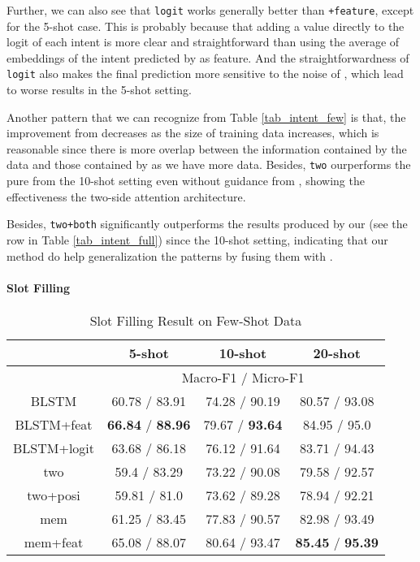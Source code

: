 Further, we can also see that \texttt{logit} works generally better than \texttt{+feature}, except for the 5-shot case. This is probably because that adding a value directly to the logit of each intent is more clear and straightforward than using the average of embeddings of the intent predicted by \RE as feature. And the straightforwardness of \texttt{logit} also makes the final prediction more sensitive to the noise of \RE, which lead to worse results in the 5-shot setting.

Another pattern that we can recognize from Table \ref{tab_intent_few} is that, the improvement from \RE decreases as the size of training data increases, which is reasonable since there is more overlap between the information contained by the data and those contained by \RE as we have more data. Besides, \texttt{two} ourperforms the pure \BLSTM from the 10-shot setting even without guidance from \RE, showing the effectiveness the two-side attention architecture.

Besides, \texttt{two+both} significantly outperforms the results produced by our \RE (see the \RE row in Table \ref{tab_intent_full}) since the 10-shot setting, indicating that our method do help generalization the \RE patterns by fusing them with \NN. 


\paragraph{Slot Filling}

\begin{table}
\setlength{\tabcolsep}{0.23em}
\centering
\small{
\begin{tabular}{|c|c|c|c|}

\hline
  & \multicolumn{1}{|c|}{5-shot} & \multicolumn{1}{|c|}{10-shot} & \multicolumn{1}{|c|}{20-shot}  \\
 \hline
  &  \multicolumn{3}{|c|}{Macro-F1 / Micro-F1}   \\
\hline
BLSTM & 60.78 / 83.91 & 74.28  / 90.19 & 80.57 / 93.08 \\
\hline
BLSTM+feat & \textbf{66.84} / \textbf{88.96} & 79.67 / \textbf{93.64} & 84.95 / 95.0 \\
\hline
BLSTM+logit & 63.68 / 86.18 & 76.12 / 91.64  & 83.71 / 94.43 \\
\hline
two & 59.4 / 83.29 & 73.22 / 90.08 & 79.58 / 92.57 \\
\hline
two+posi & 59.81 / 81.0 & 73.62 / 89.28 & 78.94 / 92.21 \\
\hline
mem & 61.25 / 83.45 & 77.83 / 90.57 & 82.98 / 93.49 \\
\hline
mem+feat & 65.08 / 88.07 & 80.64 / 93.47 & \textbf{85.45} / \textbf{95.39} \\
\hline
\end{tabular}
}
\caption{Slot Filling Result on Few-Shot Data}
\label{tab_slot_few}
\end{table}

